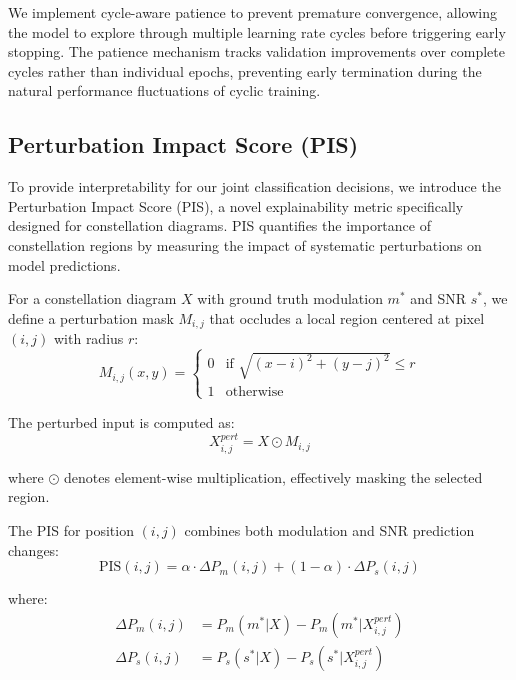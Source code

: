 \documentclass{ELSP}
\begin{document}
We implement cycle-aware patience to prevent premature convergence, allowing the model to explore through multiple learning rate cycles before triggering early stopping. The patience mechanism tracks validation improvements over complete cycles rather than individual epochs, preventing early termination during the natural performance fluctuations of cyclic training.

\subsection{Perturbation Impact Score (PIS)}

To provide interpretability for our joint classification decisions, we introduce the Perturbation Impact Score (PIS), a novel explainability metric specifically designed for constellation diagrams. PIS quantifies the importance of constellation regions by measuring the impact of systematic perturbations on model predictions.

For a constellation diagram $X$ with ground truth modulation $m^*$ and SNR $s^*$, we define a perturbation mask $M_{i,j}$ that occludes a local region centered at pixel $(i,j)$ with radius $r$:
\begin{equation}
M_{i,j}(x,y) = \begin{cases}
0 & \text{if } \sqrt{(x-i)^2 + (y-j)^2} \leq r \\
1 & \text{otherwise}
\end{cases}
\end{equation}

The perturbed input is computed as:
\begin{equation}
X_{i,j}^{pert} = X \odot M_{i,j}
\end{equation}

where $\odot$ denotes element-wise multiplication, effectively masking the selected region.

The PIS for position $(i,j)$ combines both modulation and SNR prediction changes:
\begin{equation}
\text{PIS}(i,j) = \alpha \cdot \Delta P_m(i,j) + (1-\alpha) \cdot \Delta P_s(i,j)
\end{equation}

where:
\begin{equation}
\begin{aligned}
\Delta P_m(i,j) &= P_m(m^*|X) - P_m(m^*|X_{i,j}^{pert}) \\
\Delta P_s(i,j) &= P_s(s^*|X) - P_s(s^*|X_{i,j}^{pert})
\end{aligned}
\end{equation}
\end{document}
